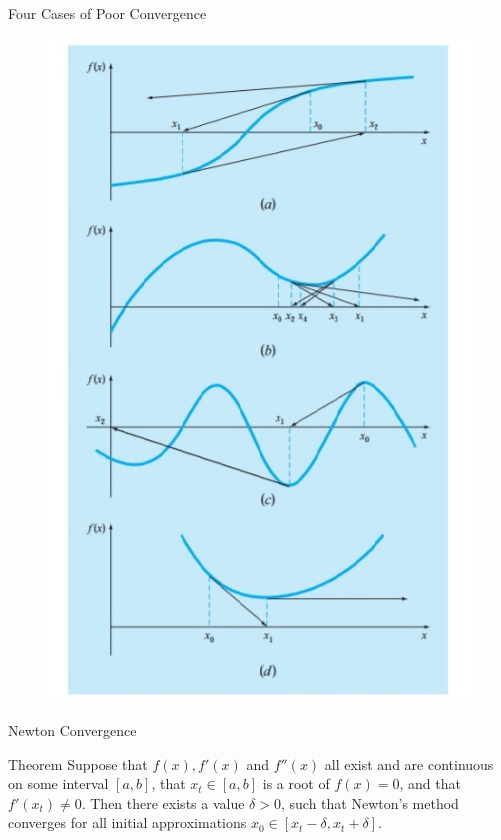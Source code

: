 \documentclass[12pt]{beamer}
\begin{document}
\begin{frame}{Four Cases of Poor Convergence}
\begin{figure}[ht]
  \centering
  \includegraphics[scale=0.6]{BadNewton}
  \label{fig:BadNewton}
\end{figure}


\end{frame}

\begin{frame}{Newton Convergence} 

\begin{block}{Theorem} Suppose that $f(x),f'(x)$ and $f''(x)$ all exist and are continuous on some interval $[a,b]$, that $x_t \in [a,b]$ is a root of $f(x) = 0$, and that $f'(x_t) \neq 0$. Then there exists a value $\delta > 0$, such that Newton's method converges for all initial approximations $x_0 \in [x_t - \delta, x_t + \delta]$. 
\end{block} 
\end{frame} 
\end{document}
